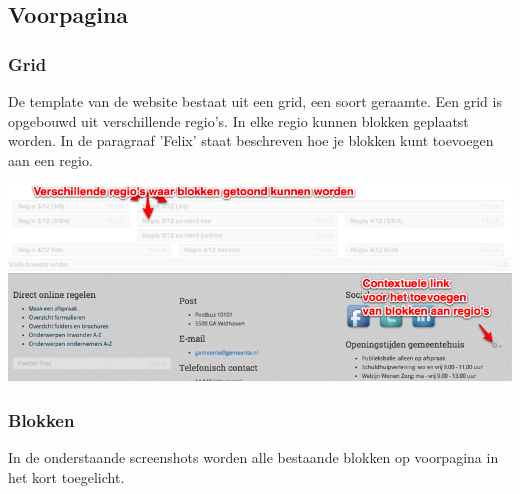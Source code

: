 
\subsection{Voorpagina}\label{voorpagina}


\subsubsection{Grid}

De template van de website bestaat uit een grid, een soort geraamte. Een grid is opgebouwd uit verschillende regio's. In elke regio kunnen blokken geplaatst worden. In de paragraaf 'Felix' staat beschreven hoe je blokken kunt toevoegen aan een regio. 

\bigskip

\begin{center}
	\includegraphics[width=\textwidth]{img/grid1.png}
\end{center}


\subsubsection{Blokken}

In de onderstaande screenshots worden alle bestaande blokken op voorpagina in het kort toegelicht.

\bigskip

